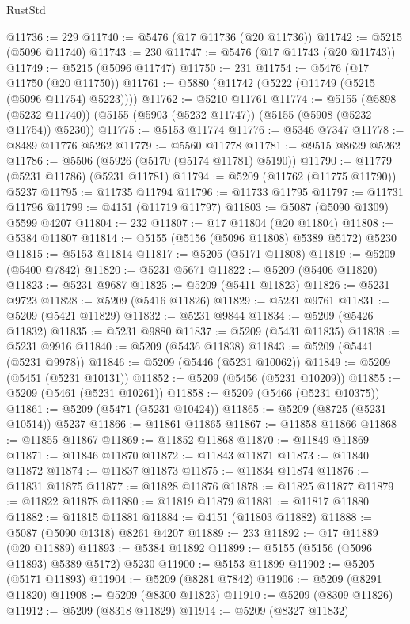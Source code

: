 \begin{lexlean}{RustStd}
\begin{coremodule}
@11736 := 229
@11740 := @5476 (@17 @11736 (@20 @11736))
@11742 := @5215 (@5096 @11740)
@11743 := 230
@11747 := @5476 (@17 @11743 (@20 @11743))
@11749 := @5215 (@5096 @11747)
@11750 := 231
@11754 := @5476 (@17 @11750 (@20 @11750))
@11761 := @5880 (@11742 (@5222 (@11749 (@5215 (@5096 @11754) @5223))))
@11762 := @5210 @11761
@11774 := @5155
    (@5898 (@5232 @11740))
    (@5155 (@5903 (@5232 @11747)) (@5155 (@5908 (@5232 @11754)) @5230))
@11775 := @5153 @11774
@11776 := @5346 @7347
@11778 := @8489 @11776 @5262
@11779 := @5560 @11778
@11781 := @9515 @8629 @5262
@11786 := @5506 (@5926 (@5170 (@5174 @11781) @5190))
@11790 := @11779 (@5231 @11786) (@5231 @11781)
@11794 := @5209 (@11762 (@11775 @11790)) @5237
@11795 := @11735 @11794
@11796 := @11733 @11795
@11797 := @11731 @11796
@11799 := @4151 (@11719 @11797)
@11803 := @5087 (@5090 @1309) @5599 @4207
@11804 := 232
@11807 := @17 @11804 (@20 @11804)
@11808 := @5384 @11807
@11814 := @5155 (@5156 (@5096 @11808) @5389 @5172) @5230
@11815 := @5153 @11814
@11817 := @5205 (@5171 @11808)
@11819 := @5209 (@5400 @7842)
@11820 := @5231 @5671
@11822 := @5209 (@5406 @11820)
@11823 := @5231 @9687
@11825 := @5209 (@5411 @11823)
@11826 := @5231 @9723
@11828 := @5209 (@5416 @11826)
@11829 := @5231 @9761
@11831 := @5209 (@5421 @11829)
@11832 := @5231 @9844
@11834 := @5209 (@5426 @11832)
@11835 := @5231 @9880
@11837 := @5209 (@5431 @11835)
@11838 := @5231 @9916
@11840 := @5209 (@5436 @11838)
@11843 := @5209 (@5441 (@5231 @9978))
@11846 := @5209 (@5446 (@5231 @10062))
@11849 := @5209 (@5451 (@5231 @10131))
@11852 := @5209 (@5456 (@5231 @10209))
@11855 := @5209 (@5461 (@5231 @10261))
@11858 := @5209 (@5466 (@5231 @10375))
@11861 := @5209 (@5471 (@5231 @10424))
@11865 := @5209 (@8725 (@5231 @10514)) @5237
@11866 := @11861 @11865
@11867 := @11858 @11866
@11868 := @11855 @11867
@11869 := @11852 @11868
@11870 := @11849 @11869
@11871 := @11846 @11870
@11872 := @11843 @11871
@11873 := @11840 @11872
@11874 := @11837 @11873
@11875 := @11834 @11874
@11876 := @11831 @11875
@11877 := @11828 @11876
@11878 := @11825 @11877
@11879 := @11822 @11878
@11880 := @11819 @11879
@11881 := @11817 @11880
@11882 := @11815 @11881
@11884 := @4151 (@11803 @11882)
@11888 := @5087 (@5090 @1318) @8261 @4207
@11889 := 233
@11892 := @17 @11889 (@20 @11889)
@11893 := @5384 @11892
@11899 := @5155 (@5156 (@5096 @11893) @5389 @5172) @5230
@11900 := @5153 @11899
@11902 := @5205 (@5171 @11893)
@11904 := @5209 (@8281 @7842)
@11906 := @5209 (@8291 @11820)
@11908 := @5209 (@8300 @11823)
@11910 := @5209 (@8309 @11826)
@11912 := @5209 (@8318 @11829)
@11914 := @5209 (@8327 @11832)

\end{coremodule}
\end{lexlean}
